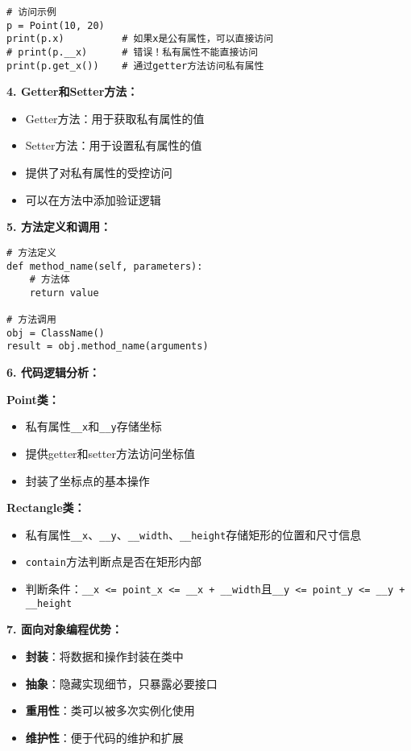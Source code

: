 \begin{mdframed}
\begin{lstlisting}
# 访问示例
p = Point(10, 20)
print(p.x)          # 如果x是公有属性，可以直接访问
# print(p.__x)      # 错误！私有属性不能直接访问
print(p.get_x())    # 通过getter方法访问私有属性
  \end{lstlisting}

  \textbf{4. Getter和Setter方法：}
  \begin{itemize}
    \item Getter方法：用于获取私有属性的值
    \item Setter方法：用于设置私有属性的值
    \item 提供了对私有属性的受控访问
    \item 可以在方法中添加验证逻辑
  \end{itemize}

  \textbf{5. 方法定义和调用：}
  \begin{lstlisting}
# 方法定义
def method_name(self, parameters):
    # 方法体
    return value

# 方法调用
obj = ClassName()
result = obj.method_name(arguments)
  \end{lstlisting}

  \textbf{6. 代码逻辑分析：}

  \textbf{Point类：}
  \begin{itemize}
    \item 私有属性\texttt{\_\_x}和\texttt{\_\_y}存储坐标
    \item 提供getter和setter方法访问坐标值
    \item 封装了坐标点的基本操作
  \end{itemize}

  \textbf{Rectangle类：}
  \begin{itemize}
    \item 私有属性\texttt{\_\_x}、\texttt{\_\_y}、\texttt{\_\_width}、\texttt{\_\_height}存储矩形的位置和尺寸信息
    \item \texttt{contain}方法判断点是否在矩形内部
    \item 判断条件：\texttt{\_\_x <= point\_x <= \_\_x + \_\_width}且\texttt{\_\_y <= point\_y <= \_\_y + \_\_height}
  \end{itemize}

  \textbf{7. 面向对象编程优势：}
  \begin{itemize}
    \item \textbf{封装}：将数据和操作封装在类中
    \item \textbf{抽象}：隐藏实现细节，只暴露必要接口
    \item \textbf{重用性}：类可以被多次实例化使用
    \item \textbf{维护性}：便于代码的维护和扩展
  \end{itemize}


\end{mdframed}
